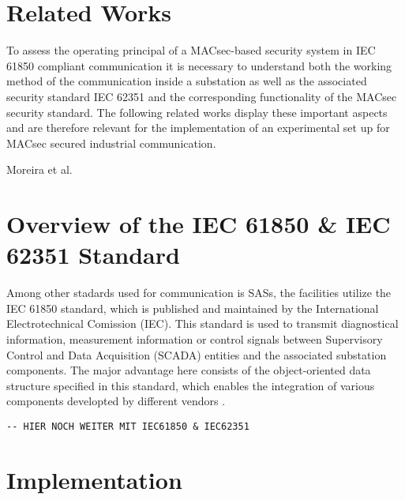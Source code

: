 \documentclass[conference]{IEEEtran}
\begin{document}
\section{Related Works}
\label{chapter:relatedWork}
To assess the operating principal of a MACsec-based security system in IEC 61850 compliant communication it is necessary to understand both the working 
method of the communication inside a substation as well as the associated security standard IEC 62351 and the corresponding functionality of the MACsec 
security standard. The following related works display these important aspects and are therefore relevant for the implementation of an experimental set 
up for MACsec secured industrial communication.

\smallskip
Moreira et al. \cite{Cybersecurity_Substation:2016}

\section{Overview of the IEC 61850 \& IEC 62351 Standard}
\label{chapter:fundamentalsIEC}
Among other stadards used for communication is SASs, the facilities utilize the IEC 61850 standard, which is published and maintained by the International 
Electrotechnical Comission (IEC). This standard is used to transmit diagnostical information, measurement information or control signals between 
Supervisory Control and Data Acquisition (SCADA) entities and the associated substation components. The major advantage here consists of the object-oriented 
data structure specified in this standard, which enables the integration of various components developted by different vendors \cite[p. 5643]{Review_IEC62351:2019}. 

\begin{verbatim}
-- HIER NOCH WEITER MIT IEC61850 & IEC62351
\end{verbatim}

\section{Implementation}
\label{chapter:implementation}


\end{document}
